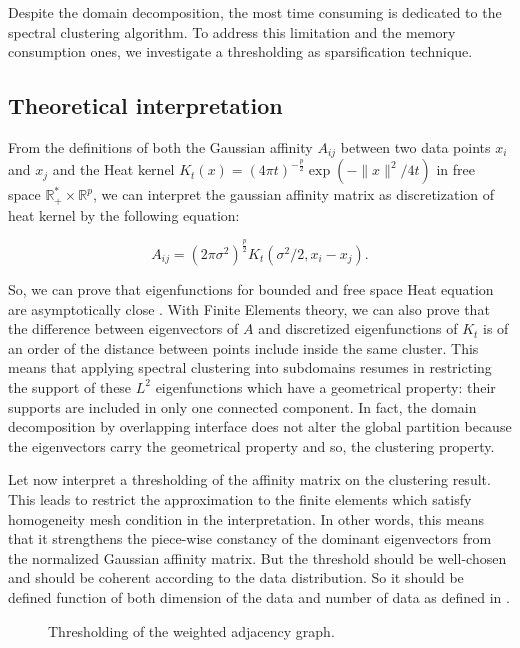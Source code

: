 \documentclass{llncs}
\begin{document}
Despite the domain decomposition, the most time consuming is dedicated to the
spectral clustering algorithm. To address this limitation and the memory
consumption ones,  we investigate a
thresholding as sparsification technique.

\subsection{Theoretical interpretation}

From the definitions of  both the Gaussian affinity $A_{ij}$ between two data
points $x_i$ and $x_j$ and the Heat kernel $K_t(x)=(4\pi
t)^{-\frac{p}{2}}\exp\left(-{\|x\|^2}/{4t}\right)$ in free space
$\mathbb{R}^*_+ \times \mathbb{R}^p$, we can interpret the gaussian affinity
matrix as discretization of heat kernel by the following equation:

\begin{equation}
A_{ij}=(2\pi \sigma^2)^{\frac{p}{2}} K_t\left({\sigma^2}/{2},x_i-x_j\right). \label{lien}
\end{equation}

So, we can prove that eigenfunctions for bounded and free space Heat equation
are asymptotically close \cite{mouysset2}. With Finite Elements theory, we can
also prove that the difference between eigenvectors of $A$ and discretized
eigenfunctions of $K_t$ is of an order of the distance between points include
inside the same cluster. This means that applying spectral clustering into
subdomains resumes in restricting the support of these $L^2$ eigenfunctions
which have a geometrical property: their supports are included in only one
connected component. In fact, the domain decomposition by overlapping
interface does not alter the global partition because the eigenvectors carry the
geometrical property and so, the clustering property.

Let now interpret a thresholding of the affinity matrix on the clustering
result. This leads to restrict the approximation to the finite elements which
satisfy homogeneity mesh condition in the interpretation. In other words,
this means that it strengthens the piece-wise constancy of the dominant eigenvectors
from the normalized Gaussian affinity matrix. But the threshold should be
well-chosen and should be coherent according to the data distribution. So it
should be defined function of both dimension of the data and number of data as
defined in \cite{mouysset2}.
 
 
\begin{figure}
  \begin{center}
    \hspace{2cm}
  \end{center}
  \caption{Thresholding of  the weighted adjacency graph.}
  \label{seuil}
 \end{figure}
\end{document}
